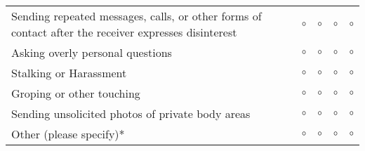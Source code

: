 \begin{adjustwidth*}{-10em}{}
\begin{table}[H]
\begin{tabular}{m{5.5cm} m{1.5cm} m{1.5cm} m{1.5cm} m{2cm}}
        Sending repeated messages, calls, or other forms of contact after the receiver expresses disinterest & \multicolumn{1}{c}{{\Large $\circ$}} & \multicolumn{1}{c}{{\Large $\circ$}} & \multicolumn{1}{c}{{\Large $\circ$}} & \multicolumn{1}{c}{{\Large $\circ$}}\\
        Asking overly personal questions & \multicolumn{1}{c}{{\Large $\circ$}} & \multicolumn{1}{c}{{\Large $\circ$}} & \multicolumn{1}{c}{{\Large $\circ$}} & \multicolumn{1}{c}{{\Large $\circ$}}\\
        Stalking or Harassment & \multicolumn{1}{c}{{\Large $\circ$}} & \multicolumn{1}{c}{{\Large $\circ$}} & \multicolumn{1}{c}{{\Large $\circ$}} & \multicolumn{1}{c}{{\Large $\circ$}}\\
        Groping or other touching & \multicolumn{1}{c}{{\Large $\circ$}} & \multicolumn{1}{c}{{\Large $\circ$}} & \multicolumn{1}{c}{{\Large $\circ$}} & \multicolumn{1}{c}{{\Large $\circ$}}\\
        Sending unsolicited photos of private body areas & \multicolumn{1}{c}{{\Large $\circ$}} & \multicolumn{1}{c}{{\Large $\circ$}} & \multicolumn{1}{c}{{\Large $\circ$}} & \multicolumn{1}{c}{{\Large $\circ$}}\\
        Other (please specify)* & \multicolumn{1}{c}{{\Large $\circ$}} & \multicolumn{1}{c}{{\Large $\circ$}} & \multicolumn{1}{c}{{\Large $\circ$}} & \multicolumn{1}{c}{{\Large $\circ$}}\\
        \bottomrule
    \end{tabular}
\end{table}

\end{adjustwidth*}
